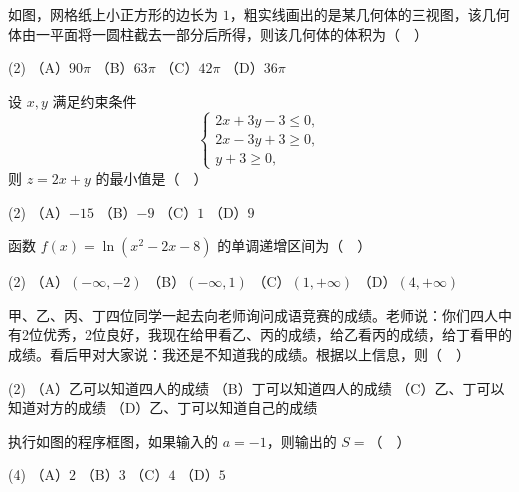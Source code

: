 \begin{question}
如图，网格纸上小正方形的边长为 \(1\)，粗实线画出的是某几何体的三视图，该几何体由一平面将一圆柱截去一部分后所得，则该几何体的体积为（　）
\nopagebreak[4]
\begin{center}\end{center}
\nopagebreak[4]
\begin{gkopts}(2)
\task （A）\(90\pi\)
\task （B）\(63\pi\)
\task （C）\(42\pi\)
\task （D）\(36\pi\)
\end{gkopts}

\end{question}
\begin{question}
设 \(x,y\) 满足约束条件
\nopagebreak[4]
\[
\begin{cases}
2x+3y-3\le 0,\\
2x-3y+3\ge 0,\\
y+3\ge 0,
\end{cases}
\]
则 \(z=2x+y\) 的最小值是（　）

\begin{gkopts}(2)
\task （A）\(-15\)
\task （B）\(-9\)
\task （C）\(1\)
\task （D）\(9\)
\end{gkopts}

\end{question}
\begin{question}
函数 \(f(x)=\ln(x^2-2x-8)\) 的单调递增区间为（　）

\begin{gkopts}(2)
\task （A）\((-\infty,-2)\)
\task （B）\((-\infty,1)\)
\task （C）\((1,+\infty)\)
\task （D）\((4,+\infty)\)
\end{gkopts}

\end{question}
\begin{question}
甲、乙、丙、丁四位同学一起去向老师询问成语竞赛的成绩。老师说：你们四人中有2位优秀，2位良好，我现在给甲看乙、丙的成绩，给乙看丙的成绩，给丁看甲的成绩。看后甲对大家说：我还是不知道我的成绩。根据以上信息，则（　）

\begin{gkopts}(2)
\task （A）乙可以知道四人的成绩
\task （B）丁可以知道四人的成绩
\task （C）乙、丁可以知道对方的成绩
\task （D）乙、丁可以知道自己的成绩
\end{gkopts}

\Needspace{0.4\textheight}
\end{question}
\begin{question}
执行如图的程序框图，如果输入的 \(a=-1\)，则输出的 \(S=\)（　）
\nopagebreak[4]
\begin{center}\end{center}
\nopagebreak[4]
\begin{gkopts}(4)
\task （A）\(2\)
\task （B）\(3\)
\task （C）\(4\)
\task （D）\(5\)
\end{gkopts}

\end{question}
